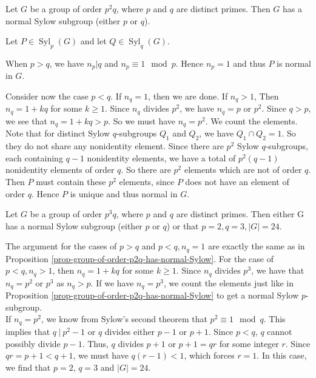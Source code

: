 \begin{proposition} \label{prop-group-of-order-p2q-has-normal-Sylow}
	Let $G$ be a group of order $p^2q$, where $p$ and $q$ are distinct primes. Then $G$ has a normal Sylow subgroup (either $p$ or $q$).
\end{proposition}
\begin{sketch}
	Let $P\in \operatorname{Syl}_p(G)$ and let $Q\in\operatorname{Syl}_q(G)$.
	
	When $p > q$, we have $n_p | q$ and $n_p \equiv 1\mod p$. Hence $n_p = 1$ and thus $P$ is normal in $G$.
	
	Consider now the case $p<q$. If $n_q=1$, then we are done. If $n_q>1$, Then $n_q  = 1+kq$ for some $k\geq 1$. Since $n_q$ divides $p^2$, we have $n_q=p$ or $p^2$. Since $q>p$, we see that $n_q = 1+kq > p $. So we must have $n_q  = p^2$.  We count the elements. Note that for distinct Sylow $q$-subgroups $Q_1$ and $Q_2$, we have $Q_1\cap Q_2 = 1$. So they do not share any nonidentity element. Since there are $p^2$ Sylow $q$-subgroups, each
	containing $q -1$ nonidentity elements, we have a total of $p^2(q-1)$ nonidentity elements of order $q$. So there are $p^2$ elements which are not of order $q$. Then $P$ must contain these $p^2$ elements, since $P$ does not have an element of order $q$. Hence $P$ is unique and thus normal in $G$.
\end{sketch}

\begin{proposition} \label{prop-group-of-order-p3q-has-normal-Sylow}
	Let $G$ be a group of order $p^3q$, where $p$ and $q$ are distinct primes. Then either G has a normal Sylow subgroup (either $p$ or $q$) or that $p=2, q=3, |G|=24$.
\end{proposition}
\begin{sketch}
	The argument for the cases of $p > q$ and $p < q, n_q = 1$ are exactly the same as in Proposition \ref{prop-group-of-order-p2q-has-normal-Sylow}. For the case of $p < q, n_q > 1$, then $n_q = 1 + kq$ for some $k \geq 1$. Since $n_q$ divides $p^3$, we have that $n_q = p^2$ or $p^3$ as $n_q > p$. If we have $n_q = p^3$, we count the elements just like in Proposition \ref{prop-group-of-order-p2q-has-normal-Sylow} to get a normal Sylow $p$-subgroup. \\

	If $n_q = p^2$, we know from Sylow's second theorem that $p^2 \equiv 1\mod q$. This implies that $q ~|~ p^2-1$ or $q$ divides either $p-1$ or $p+1$. Since $p < q$, $q$ cannot possibly divide $p-1$. Thus, $q$ divides $p+1$ or $p+1 = qr$ for some integer $r$. Since $qr = p+1 < q+1$, we must have $q(r-1) < 1$, which forces $r=1$. In this case, we find that $p=2$, $q=3$ and $|G| =24$.
\end{sketch}

